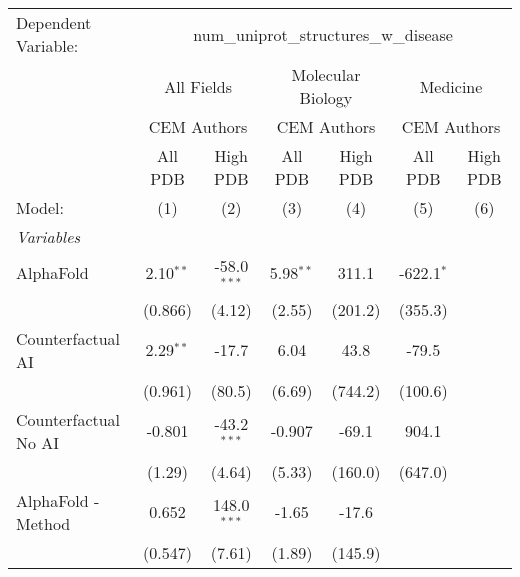 \begingroup
\centering
\begin{tabular}{lcccccc}
   \tabularnewline \midrule \midrule
   Dependent Variable: & \multicolumn{6}{c}{num\_uniprot\_structures\_w\_disease}\\
 & \multicolumn{2}{c}{All Fields} & \multicolumn{2}{c}{Molecular Biology} & \multicolumn{2}{c}{Medicine} \\
\cmidrule(lr){2-3} \cmidrule(lr){4-5} \cmidrule(lr){6-7}
 & \multicolumn{2}{c}{CEM Authors} & \multicolumn{2}{c}{CEM Authors} & \multicolumn{2}{c}{CEM Authors} \\
\cmidrule(lr){2-3} \cmidrule(lr){4-5} \cmidrule(lr){6-7}
 & \multicolumn{1}{c}{All PDB} & \multicolumn{1}{c}{High PDB} & \multicolumn{1}{c}{All PDB} & \multicolumn{1}{c}{High PDB} & \multicolumn{1}{c}{All PDB} & \multicolumn{1}{c}{High PDB} \\
\cmidrule(lr){2-2} \cmidrule(lr){3-3} \cmidrule(lr){4-4} \cmidrule(lr){5-5} \cmidrule(lr){6-6} \cmidrule(lr){7-7}
   Model:                                                     & (1)         & (2)             & (3)         & (4)     & (5)          & (6)\\  
   \midrule
   \emph{Variables}\\
   AlphaFold                                                  & 2.10$^{**}$ & -58.0$^{***}$   & 5.98$^{**}$ & 311.1   & -622.1$^{*}$ &   \\   
                                                              & (0.866)     & (4.12)          & (2.55)      & (201.2) & (355.3)      &   \\   
   Counterfactual AI                                          & 2.29$^{**}$ & -17.7           & 6.04        & 43.8    & -79.5        &   \\   
                                                              & (0.961)     & (80.5)          & (6.69)      & (744.2) & (100.6)      &   \\   
   Counterfactual No AI                                       & -0.801      & -43.2$^{***}$   & -0.907      & -69.1   & 904.1        &   \\   
                                                              & (1.29)      & (4.64)          & (5.33)      & (160.0) & (647.0)      &   \\   
   AlphaFold - Method                                         & 0.652       & 148.0$^{***}$   & -1.65       & -17.6   &              &   \\   
                                                              & (0.547)     & (7.61)          & (1.89)      & (145.9) &              &   \\   

\end{tabular}
